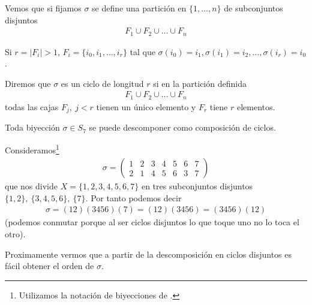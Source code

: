 Vemos que si fijamos $\sigma$ se define una partición en $\{1, \dots, n\}$ de subconjuntos disjuntos
\begin{align*}
F_1 \cup F_2 \cup \dots \cup F_n
\end{align*}

Si $r = |F_i| > 1$, $F_i = \{i_0, i_1, \dots, i_r\}$ tal que $\sigma(i_0) = i_1, \sigma(i_1) = i_2, \dots, \sigma(i_r) = i_0$.

\begin{dfn}[Ciclo]
	\label{dfn:ciclo}
	Diremos que $\sigma$ es un ciclo de longitud $r$ si en la partición definida
	\begin{align*}
	F_1 \cup F_2 \cup \dots \cup F_n
	\end{align*}
	todas las cajas $F_j,\ j < r$ tienen un único elemento y $F_r$ tiene $r$ elementos.
\end{dfn}

\begin{pro}
	Toda biyección $\sigma \in S_7$ se puede descomponer como composición de ciclos.
\end{pro}

\begin{ej}
	Consideramos\footnote{Utilizamos la notación de biyecciones de \cite{dor96}.}
	\begin{align*}
	\sigma = \left(\begin{array}{ccccccc}
	1 & 2 & 3 & 4 & 5 & 6 & 7 \\
	2 & 1 & 4 & 5 & 6 & 3 & 7
	\end{array}\right)
	\end{align*}
	que nos divide $X = \{1, 2, 3, 4, 5, 6, 7\}$ en tres subconjuntos disjuntos $\{1, 2\},\ \{3, 4, 5, 6\},\ \{7\}$. Por tanto podemos decir
	\begin{align*}
	\sigma = (12)(3456)(7) = (12)(3456) = (3456)(12)
	\end{align*}
	(podemos conmutar porque al ser ciclos disjuntos lo que toque uno no lo toca el otro).
\end{ej}

Proximamente vermos que a partir de la descomposición en ciclos disjuntos es fácil obtener el orden de $\sigma$.
